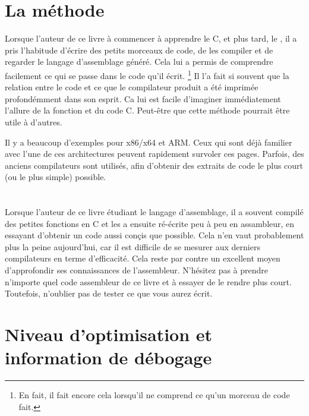\section{La méthode}

Lorsque l'auteur de ce livre à commencer à apprendre le C, et plus tard, le \Cpp, il a pris l'habitude d'écrire des petits morceaux de
code, de les compiler et de regarder le langage d'assemblage généré. 
Cela lui a permis de comprendre facilement ce qui se passe dans le code qu'il écrit.
\footnote{En fait, il fait encore cela lorsqu'il ne comprend ce qu'un morceau de code fait.}
Il l'a fait si souvent que la relation entre le code \Cpp et ce que le compilateur produit a été imprimée profondémment dans son
 esprit.
Ca lui est facile d'imaginer immédiatement l'allure de la fonction et du code C.
Peut-être que cette méthode pourrait être utile à d'autres.

Il y a beaucoup d'exemples pour x86/x64 et ARM.
Ceux qui sont déjà familier avec l'une de ces architectures peuvent rapidement survoler ces pages.
Parfois, des anciens compilateurs sont utilisés, afin d'obtenir des extraits de code le plus court (ou le plus simple) possible.

\section*{\Exercises}

Lorsque l'auteur de ce livre étudiant le langage d'assemblage, il a souvent compilé des petites fonctions en C et les a ensuite
ré-écrite peu à peu en assambleur, en essayant d'obtenir un code aussi conçis que possible.
Cela n'en vaut probablement plus la peine aujourd'hui, car il est difficile
de se mesurer aux derniers compilateurs en terme d'efficacité. Cela reste par contre un excellent moyen d'approfondir ses connaissances
de l'assembleur.
N'hésitez pas à prendre n'importe quel code assembleur de ce livre et à essayer de le rendre plus court.
Toutefois, n'oublier pas de tester ce que vous aurez écrit.

\section*{Niveau d'optimisation et information de débogage}

